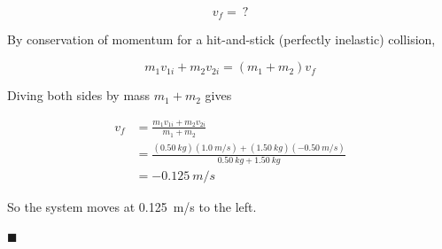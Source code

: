 \documentclass[dvipsnames]{article}
\begin{document}
\begin{equation*}
    v_{f} = \ ?
\end{equation*}

By conservation of momentum for a hit-and-stick (perfectly inelastic) collision, 

\begin{equation*}
    m_1 v_{1i} + m_2 v_{2i} = (m_1 + m_2) v_f
\end{equation*}

Diving both sides by mass $m_1 + m_2$ gives

\begin{align*}
    v_f &= \frac{m_1 v_{1i} + m_2 v_{2i}}{m_1 + m_2} \\[1ex]
    &= \frac{(\SI{0.50}{kg})(\SI{1.0}{m/s}) + (\SI{1.50}{kg})(\SI{-0.50}{m/s})}{\SI{0.50}{kg} + \SI{1.50}{kg}} \\[1ex]
    &= \boxed{\SI{-0.125}{m/s}}
\end{align*}

So the system moves at \SI{0.125}{m/s} to the left.

\hfill $\blacksquare$
\end{document}
